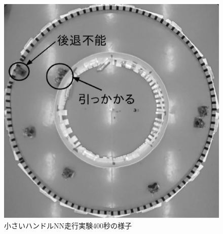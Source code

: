 \vspace{-5mm}
\begin{figure}[!ht]
    \centering
    \includegraphics[width=0.6\linewidth]{nnhandle15.eps}
    \caption{小さいハンドルNN走行実験400秒の様子}
    \label{handle15_img}
\end{figure}

